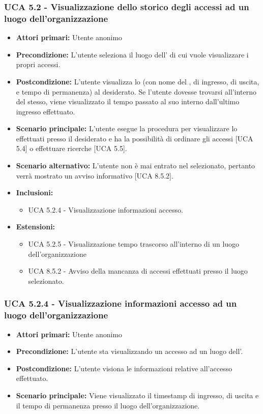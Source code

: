 \subsubsection{UCA 5.2 - Visualizzazione dello storico degli accessi ad un luogo dell'organizzazione}
\begin{itemize}
    \item \textbf{Attori primari:} Utente anonimo
    \item \textbf{Precondizione:} L'utente seleziona il luogo dell' di cui vuole visualizzare i propri accessi.
    \item \textbf{Postcondizione:} L'utente visualizza lo  (con nome del ,  di ingresso, di uscita, e tempo di permanenza) al  desiderato. Se l'utente dovesse trovarsi all'interno del  stesso, viene visualizzato il tempo passato al suo interno dall'ultimo ingresso effettuato.
    \item \textbf{Scenario principale:} L'utente esegue la procedura per visualizzare lo  effettuati presso il  desiderato e ha la possibilità di ordinare gli accessi [UCA 5.4] o effettuare ricerche [UCA 5.5].
    \item \textbf{Scenario alternativo:} L'utente non è mai entrato nel  selezionato, pertanto verrà mostrato un avviso informativo [UCA 8.5.2].
    \item \textbf{Inclusioni:}
    \begin{itemize}
        \item UCA 5.2.4 - Visualizzazione informazioni accesso.
    \end{itemize}
    \item \textbf{Estensioni:}
    \begin{itemize}
        \item UCA 5.2.5 - Visualizzazione tempo trascorso all'interno di un luogo dell'organizzazione
        \item UCA 8.5.2 - Avviso della mancanza di accessi effettuati presso il luogo selezionato.
    \end{itemize}
\end{itemize}

\subsubsection{UCA 5.2.4 - Visualizzazione informazioni accesso ad un luogo dell'organizzazione}
\begin{itemize}
	\item \textbf{Attori primari:} Utente anonimo
	\item \textbf{Precondizione:} L'utente sta visualizzando un accesso ad un luogo dell'.
	\item \textbf{Postcondizione:} L'utente visiona le informazioni relative all'accesso effettuato.
	\item \textbf{Scenario principale:} Viene visualizzato il timestamp di ingresso, di uscita e il tempo di permanenza presso  il luogo dell'organizzazione.
\end{itemize}

